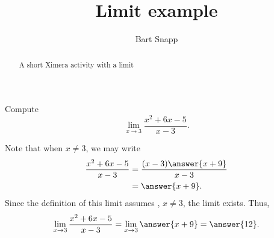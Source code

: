 \documentclass{ximera}
\title{Limit example}  %
\author{Bart Snapp}  %
\begin{document}
   
\begin{abstract}  %
A short Ximera activity with a limit
\end{abstract}  %
\maketitle  %

\begin{example}
Compute
\[
\lim_{x \to 3} \frac{x^2 + 6x - 5}{x - 3}.
\]
\begin{solution}
Note that when $x \neq 3$, we may write
\begin{align*}
\frac{x^2 + 6x - 5}{x - 3} &= \frac{(x-3)\answer{x+9}}{x-3} \\
&= \answer{x+9}.
\end{align*}
Since the definition of this limit assumes , $x \neq 3$, the limit exists. Thus,
\[
\lim_{x \to 3} \frac{x^2 + 6x - 5}{x - 3} = \lim_{x \to 3} \answer{x+9} = \answer{12}.
\]
\end{solution}
\end{example}
\end{document}
